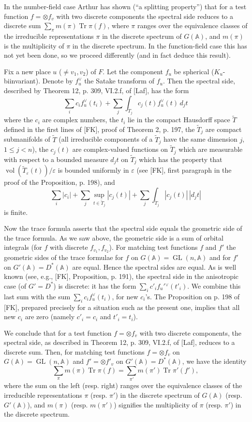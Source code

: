 \documentclass[10pt]{article}
\newcommand{\Adele}{\mathbb A}
\newcommand{\GL}{\operatorname{GL}}
\newcommand{\Tr}{\operatorname{Tr}}
\theoremstyle{deligne}
\newcommand{\vol}{\operatorname{vol}}
\begin{document}
In the number-field case Arthur has shown (``a splitting property'') that for a test function $f=\otimes f_v$ with two discrete components the spectral side reduces to a discrete sum $\sum_\pi m(\pi)\Tr\pi(f)$, where $\pi$ ranges over the equivalence classes of the irreducible representations $\pi$ in the discrete spectrum of $G(\Adele)$, and $m(\pi)$ is the multiplicity of $\pi$ in the discrete spectrum. In the function-field case this has not yet been done, so we proceed differently (and in fact deduce this result).

Fix a new place $u$ ($\ne v_1,v_2$) of $F$. Let the component $f_u$ be spherical ($K_u$-biinvariant). Denote by $f_u^{\vee}$ the Satake transform of $f_u$. Then the spectral side, described by Theorem 12, p. 309, VI.2.f, of [Laf], has the form
\[
\sum_i c_if_u^{\vee}(t_i)+\sum_j\int_{\widetilde T_j}c_j(t)f_u^{\vee}(t)\,d_jt
\]
where the $c_i$ are complex numbers, the $t_i$ lie in the compact Hausdorff space $\widetilde T$ defined in the first lines of [FK], proof of Theorem 2, p. 197, the $\widetilde T_j$ are compact submanifolds of $\widetilde T$ (all irreducible components of a $\widetilde T_j$ have the same dimension $j$, $1\le j<n$), the $c_j(t)$ are complex-valued functions on $\widetilde T_j$ which are measurable with respect to a bounded measure $d_jt$ on $\widetilde T_j$ which has the property that $\vol(\widetilde T_{\varepsilon}(t))/\varepsilon$ is bounded uniformly in $\varepsilon$ (see [FK], first paragraph in the proof of the Proposition, p. 198), and
\[
\sum_i |c_i|+\sum_j\sup_{t\in\widetilde T_j}|c_j(t)|+\sum_j\int_{\widetilde T_j}|c_j(t)|\,|d_jt|
\]
is finite.

Now the trace formula asserts that the spectral side equals the geometric side of the trace formula. As we saw above, the geometric side is a sum of orbital integrals (for $f$ with discrete $f_{v_1},f_{v_2}$). For matching test functions $f$ and $f'$ the geometric sides of the trace formulae for $f$ on $G(\Adele)=\GL(n,\Adele)$ and for $f'$ on $G'(\Adele)=D^*(\Adele)$ are equal. Hence the spectral sides are equal. As is well known (see, e.g., [FK], Proposition, p. 191), the spectral side in the anisotropic case (of $G'=D^*$) is discrete: it has the form $\sum_i c'_if_u'{}^{\vee}(t'_i)$. We combine this last sum with the sum $\sum_i c_if_u^{\vee}(t_i)$, for new $c_i$'s. The Proposition on p. 198 of [FK], prepared precisely for a situation such as the present one, implies that all new $c_i$ are zero (namely $c'_i=c_i$ and $t'_i=t_i$).

We conclude that for a test function $f=\otimes f_v$ with two discrete components, the spectral side, as described in Theorem 12, p. 309, VI.2.f, of [Laf], reduces to a discrete sum. Then, for matching test functions $f=\otimes f_v$ on $G(\Adele)=\GL(n,\Adele)$ and $f'=\otimes f'_v$ on $G'(\Adele)=D^*(\Adele)$, we have the identity
\[
\sum_\pi m(\pi)\Tr\pi(f)=\sum_{\pi'}m(\pi')\Tr\pi'(f'),
\]
where the sum on the left (resp. right) ranges over the equivalence classes of the irreducible representations $\pi$ (resp. $\pi'$) in the discrete spectrum of $G(\Adele)$ (resp. $G'(\Adele)$), and $m(\pi)$ (resp. $m(\pi')$) signifies the multiplicity of $\pi$ (resp. $\pi'$) in the discrete spectrum.
\end{document}
